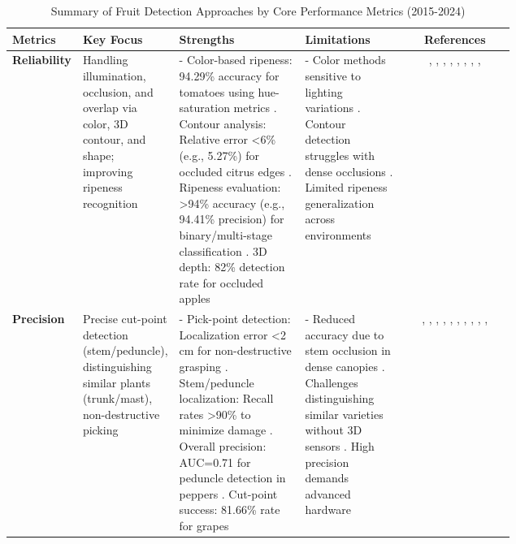 \documentclass{ieeeaccess}
\begin{document}
\iffalse
\begin{table}[htbp]
\centering
\footnotesize
\caption{Summary of Fruit Detection Approaches by Core Performance Metrics (2015-2024)}
\label{tab:performance-metrics}
\renewcommand{\arraystretch}{1.2}
\begin{tabularx}{\textwidth}{>{\raggedright\arraybackslash}m{0.12\linewidth}>{\raggedright\arraybackslash}m{0.15\linewidth}>{\raggedright\arraybackslash}m{0.25\linewidth}>{\raggedright\arraybackslash}m{0.20\linewidth}c}
\toprule
\textbf{Metrics} & \textbf{Key Focus} & \textbf{Strengths} & \textbf{Limitations} & \textbf{References} \\ \midrule
\textbf{Reliability} & Handling illumination, occlusion, and overlap via color, 3D contour, and shape; improving ripeness recognition & - Color-based ripeness: 94.29\% accuracy for tomatoes using hue-saturation metrics \cite{goel2015fuzzy}. Contour analysis: Relative error <6\% (e.g., 5.27\%) for occluded citrus edges \cite{lu2015detecting}. Ripeness evaluation: >94\% accuracy (e.g., 94.41\% precision) for binary/multi-stage classification \cite{liu2019mature}. 3D depth: 82\% detection rate for occluded apples \cite{nguyen2016detection} & - Color methods sensitive to lighting variations \cite{zhao2016detecting}. Contour detection struggles with dense occlusions \cite{lu2015detecting}. Limited ripeness generalization across environments \cite{goel2015fuzzy} & \cite{nguyen2016detection}, \cite{lu2015detecting}, \cite{mendes2016vine}, \cite{goel2015fuzzy}, \cite{zhao2016detecting}, \cite{pourdarbani2020automatic}, \cite{zhang2018deep}, \cite{longsheng2015kiwifruit}, \cite{liu2019mature} \\ \midrule
\textbf{Precision} & Precise cut-point detection (stem/peduncle), distinguishing similar plants (trunk/mast), non-destructive picking & - Pick-point detection: Localization error <2 cm for non-destructive grasping \cite{lehnert2016sweet}. Stem/peduncle localization: Recall rates >90\% to minimize damage \cite{mendes2016vine}. Overall precision: AUC=0.71 for peduncle detection in peppers \cite{sa2017peduncle}. Cut-point success: 81.66\% rate for grapes \cite{luo2018vision} & - Reduced accuracy due to stem occlusion in dense canopies \cite{sa2017peduncle}. Challenges distinguishing similar varieties without 3D sensors \cite{lin2020fruit}. High precision demands advanced hardware \cite{kusumam20173d} & \cite{kusumam20173d}, \cite{lehnert2016sweet}, \cite{bac2017performance}, \cite{mendes2016vine}, \cite{sa2017peduncle}, \cite{luo2018vision}, \cite{perez2018pattern}, \cite{liu2019mature}, \cite{pourdarbani2020automatic}, \cite{lin2020fruit}, \cite{CHEN2024111082} \\ \midrule

\end{tabularx}
\end{table}
\end{document}
